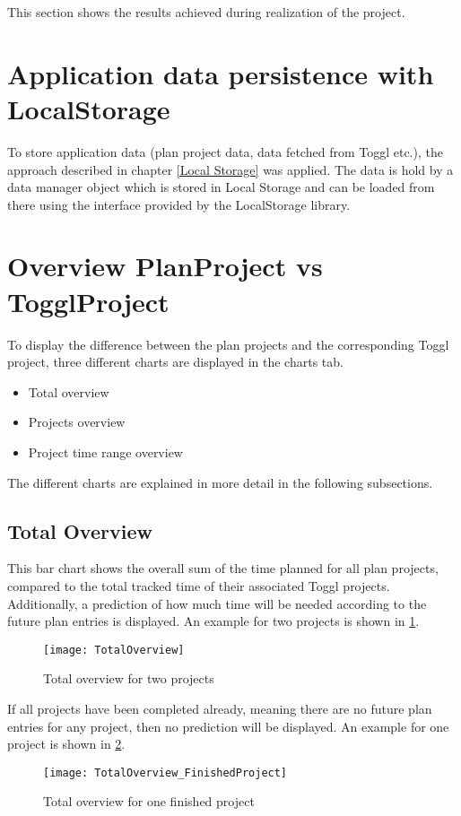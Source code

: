 
This section shows the results achieved during realization of the project.

\section{Application data persistence with LocalStorage}
To store application data (plan project data, data fetched from Toggl etc.), the approach described in chapter \ref{Local Storage} was applied. The data is hold by a data manager object which is stored in Local Storage and can be loaded from there using the interface provided by the LocalStorage library.

\section{Overview PlanProject vs TogglProject} \label{Graphical overview}
To display the difference between the plan projects and the corresponding Toggl project, three different charts are displayed in the charts tab.
\begin{itemize}
	\item Total overview
	\item Projects overview
	\item Project time range overview
\end{itemize}
The different charts are explained in more detail in the following subsections.

\subsection{Total Overview}
This bar chart shows the overall sum of the time planned for all plan projects, compared to the total tracked time of their associated Toggl projects. Additionally, a prediction of how much time will be needed according to the future plan entries is displayed. An example for two projects is shown in \ref{figure9}.
\begin{figure}[H]
	\centering
	\texttt{[image: TotalOverview]}
	\caption{Total overview for two projects}
	\label{figure9}
\end{figure}
If all projects have been completed already, meaning there are no future plan entries for any project, then no prediction will be displayed. An example for one project is shown in \ref{figure10}.
\begin{figure}[H]
	\centering
	\texttt{[image: TotalOverview\_FinishedProject]}
	\caption{Total overview for one finished project}
	\label{figure10}
\end{figure}

